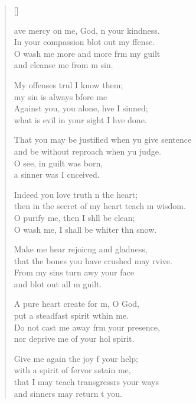 \settowidth{\versewidth}{That you may be justified when you give sentence *}
\begin{verse}[\versewidth]%
  \begin{patverse}
ave mercy on me, God, \pointup{\i}n your kindness.\Med\\
In your compassion blot out my ffense.\\
O wash me more and more frm my guilt\Med\\
and cleanse me from m sin.

My offenses trul I know them;\Med\\
my sin is always bfore me\\
Against you, you alone, hve I sinned;\Med\\
what is evil in your sight I hve done.

That you may be justified when yu give sentence\Med\\
and be without reproach when yu judge.\\
O see, in guilt \pointup{\i} was born,\Med\\
a sinner was I cnceived.

Indeed you love truth \pointup{\i}n the heart;\Med\\
then in the secret of my heart teach m wisdom.\\
O purify me, then I shll be clean;\Med\\
O wash me, I shall be whiter thn snow.

Make me hear rejoic\pointup{\i}ng and gladness,\Med\\
that the bones you have crushed may rvive.\\
From my sins turn awy your face\Med\\
and blot out all m guilt.

A pure heart create for m, O God,\Med\\
put a steadfast spirit w\pointup{\i}thin me.\\
Do not cast me away frm your presence,\Med\\
nor deprive me of your hol spirit.

Give me again the joy f your help;\Med\\
with a spirit of fervor sstain me,\\
that I may teach transgressrs your ways\Med\\
and sinners may return t you.


\end{patverse}
\end{verse}
